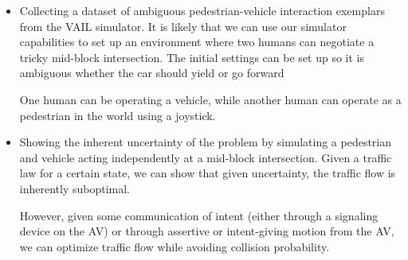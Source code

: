 \documentclass[11pt]{article}
\begin{document}
\begin{itemize}
	\item Collecting a dataset of ambiguous pedestrian-vehicle interaction exemplars from the VAIL simulator. 
	\subitem
		It is likely that we can use our simulator capabilities to set up an environment where two humans can negotiate a tricky mid-block intersection. The 
		initial settings can be set up so it is ambiguous whether the car should yield or go forward
	
	\subitem
		One human can be operating a vehicle, while another human can operate as a pedestrian in the world using a joystick.

	\item Showing the inherent uncertainty of the problem by simulating a pedestrian and vehicle acting independently at a mid-block intersection. Given a traffic law 
	for a certain state, we can show that given uncertainty, the traffic flow is inherently suboptimal.

	\subitem 
		However, given some communication of intent (either through a signaling device on the AV) or through assertive or intent-giving motion from the AV, we can optimize traffic flow while avoiding collision probability. 



\end{itemize} 





\end{document}
